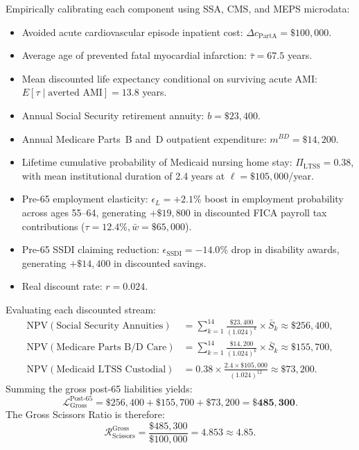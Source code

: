 \documentclass[11pt,a4paper]{article}
\begin{document}
Empirically calibrating each component using SSA, CMS, and MEPS microdata:
\begin{itemize}
    \item Avoided acute cardiovascular episode inpatient cost: $\Delta c_{\text{PartA}} = \$100,000$.
    \item Average age of prevented fatal myocardial infarction: $\bar{\tau} = 67.5$ years.
    \item Mean discounted life expectancy conditional on surviving acute AMI: $E[\tau \mid \text{averted AMI}] = 13.8$ years.
    \item Annual Social Security retirement annuity: $b = \$23,400$.
    \item Annual Medicare Parts~B and~D outpatient expenditure: $m^{BD} = \$14,200$.
    \item Lifetime cumulative probability of Medicaid nursing home stay: $\Pi_{\text{LTSS}} = 0.38$, with mean institutional duration of 2.4 years at $\ell = \$105,000$/year.
    \item Pre-65 employment elasticity: $\epsilon_L = +2.1\%$ boost in employment probability across ages 55--64, generating $+\$19,800$ in discounted FICA payroll tax contributions ($\tau = 12.4\%, \bar{w} = \$65,000$).
    \item Pre-65 SSDI claiming reduction: $\epsilon_{\text{SSDI}} = -14.0\%$ drop in disability awards, generating $+\$14,400$ in discounted savings.
    \item Real discount rate: $r = 0.024$.
\end{itemize}
Evaluating each discounted stream:
\begin{align}
    \text{NPV}(\text{Social Security Annuities}) &= \sum_{k=1}^{14} \frac{\$23,400}{(1.024)^k} \times \bar{S}_k \approx \$256,400, \\
    \text{NPV}(\text{Medicare Parts B/D Care}) &= \sum_{k=1}^{14} \frac{\$14,200}{(1.024)^k} \times \bar{S}_k \approx \$155,700, \\
    \text{NPV}(\text{Medicaid LTSS Custodial}) &= 0.38 \times \frac{2.4 \times \$105,000}{(1.024)^{12}} \approx \$73,200.
\end{align}
Summing the gross post-65 liabilities yields:
\begin{equation}
    \mathcal{L}_{\text{Gross}}^{\text{Post-65}} = \$256,400 + \$155,700 + \$73,200 = \mathbf{\$485,300}.
\end{equation}
The Gross Scissors Ratio is therefore:
\begin{equation}
    \mathcal{R}_{\text{Scissors}}^{\text{Gross}} = \frac{\$485,300}{\$100,000} = \mathbf{4.853 \approx 4.85}.
\end{equation}
\end{document}
